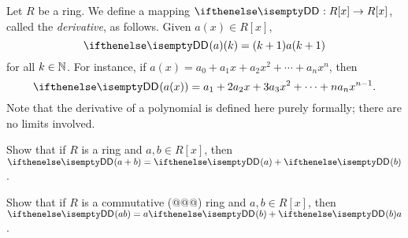 \begin{dfn}[Derivative]
Let \(R\) be a ring. We define a mapping \(\DERIV : R[x] \rightarrow R[x]\), called the \emph{derivative},  as follows. Given \(a(x) \in R[x]\), \[ \DERIV(a)(k) = (k+1)a(k+1) \] for all \(k \in \mathbb{N}\). For instance, if \(a(x) = a_0 + a_1x + a_2x^2 + \cdots + a_nx^n\), then \[ \DERIV(a(x)) = a_1 + 2a_2x + 3a_3x^2 + \cdots + na_nx^{n-1}. \] Note that the derivative of a polynomial is defined here purely formally; there are no limits involved.
\end{dfn}

\begin{exercise}
Show that if \(R\) is a ring and \(a,b \in R[x]\), then \(\DERIV(a + b) = \DERIV(a) + \DERIV(b)\).
\end{exercise}

\begin{exercise}
Show that if \(R\) is a commutative (@@@) ring and \(a,b \in R[x]\), then \(\DERIV(ab) = a\DERIV(b) + \DERIV(b)a\).
\end{exercise}
